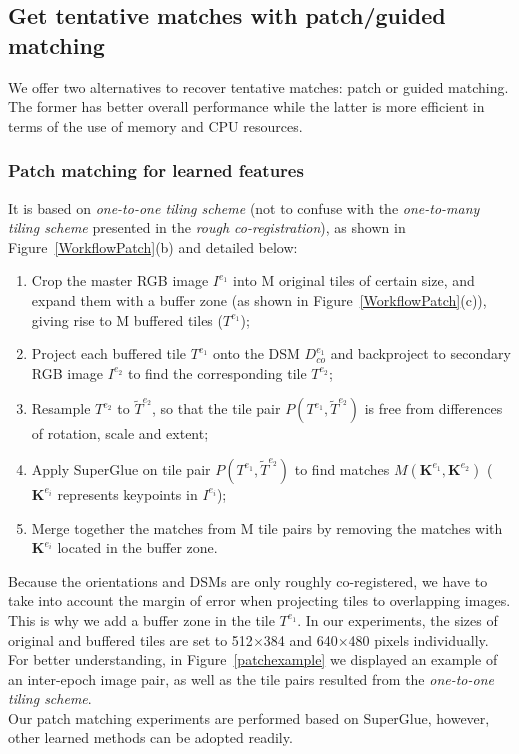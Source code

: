 \subsection{Get tentative matches with patch/guided matching}\label{patch matching}
We offer two alternatives to recover tentative matches: patch or guided matching. {The former has better overall} performance while the latter is more efficient in terms of the use of memory and CPU resources.\\
\subsubsection{Patch matching for learned features}
{{It} is based on \textit{one-to-one tiling scheme}} {(not to confuse with the \textit{one-to-many tiling scheme} presented in the \textit{rough co-registration}), as shown in Figure~\ref{WorkflowPatch}(b) and detailed below}:
\begin{enumerate}
	\item Crop the master RGB image $I^{e_1}$ into M original tiles of certain size, and expand them with a buffer zone (as shown in Figure~\ref{WorkflowPatch}(c)), giving rise to M buffered tiles ($T^{e_1}$);
	\item Project each buffered tile $T^{e_1}$ onto the DSM $D_{co}^{e_1}$ and backproject to secondary RGB image $I^{e_2}$ to find the corresponding tile $T^{e_2}$;
	\item Resample $T^{e_2}$ to $\widetilde{T}^{e_2}$, so that the tile pair $P({T^{e_1},\widetilde{T}^{e_2}})$ is free from differences of rotation, scale and extent;
	\item Apply SuperGlue on tile pair $P({T^{e_1},\widetilde{T}^{e_2}})$ to find matches $M({\mathbf{K}^{e_1},\mathbf{K}^{e_2}})$ ($\mathbf{K}^{e_i}$ represents keypoints in $I^{e_i}$);
	\item Merge together the matches from M tile pairs by removing the matches with $\mathbf{K}^{e_i}$ located in the buffer zone.\\
\end{enumerate}

Because the orientations and DSMs are only roughly co-registered, we have to take into account the margin of error when projecting tiles to overlapping images. This is why we add a buffer zone in the tile $T^{e_1}$. In our experiments, the sizes of original and buffered tiles are set to 512$\times$384 and 640$\times$480 pixels individually.\\
For better understanding, in Figure~\ref{patchexample} we displayed an example of an inter-epoch image pair, as well as the tile pairs resulted from the \textit{one-to-one tiling scheme}.\\
Our patch matching experiments are performed based on SuperGlue, however, other learned methods can be adopted readily. \\

